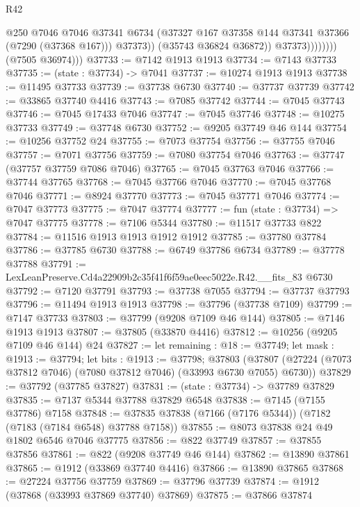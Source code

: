 \begin{lexlean}{R42}
\begin{coremodule}
{                              @250
                              @7046
                              @7046
                              @37341
                              @6734
                              (@37327 @167 @37358 @144 @37341 @37366 (@7290 (@37368 @167)))
                              @37373))
                          (@35743 @36824 @36872))
                        @37373))))))))
        (@7505 @36974)))
@37733 := @7142 @1913 @1913
@37734 := @7143 @37733
@37735 := (state : @37734) -> @7041
@37737 := @10274 @1913 @1913
@37738 := @11495 @37733
@37739 := @37738 @6730
@37740 := @37737 @37739
@37742 := @33865 @37740 @4416
@37743 := @7085 @37742
@37744 := @7045 @37743
@37746 := @7045 @17433 @7046
@37747 := @7045 @37746
@37748 := @10275 @37733
@37749 := @37748 @6730
@37752 := @9205 @37749 @46 @144
@37754 := @10256 @37752 @24
@37755 := @7073 @37754
@37756 := @37755 @7046
@37757 := @7071 @37756
@37759 := @7080 @37754 @7046
@37763 := @37747 (@37757 @37759 @7086 @7046)
@37765 := @7045 @37763 @7046
@37766 := @37744 @37765
@37768 := @7045 @37766 @7046
@37770 := @7045 @37768 @7046
@37771 := @8924 @37770
@37773 := @7045 @37771 @7046
@37774 := @7047 @37773
@37775 := @7047 @37774
@37777 := fun (state : @37734) => @7047 @37775
@37778 := @7106 @5344
@37780 := @11517 @37733 @822
@37784 := @11516 @1913 @1913 @1912 @1912
@37785 := @37780 @37784
@37786 := @37785 @6730
@37788 := @6749 @37786 @6734
@37789 := @37778 @37788
@37791 := LexLeanPreserve.Cd4a22909b2c35f41f6f59ae0eec5022e.R42.__fits_83 @6730
@37792 := @7120 @37791
@37793 := @37738 @7055
@37794 := @37737 @37793
@37796 := @11494 @1913 @1913
@37798 := @37796 (@37738 @7109)
@37799 := @7147 @37733
@37803 := @37799 (@9208 @7109 @46 @144)
@37805 := @7146 @1913 @1913
@37807 := @37805 (@33870 @4416)
@37812 := @10256 (@9205 @7109 @46 @144) @24
@37827 := let remaining : @18 := @37749;
  let mask : @1913 := @37794;
  let bits : @1913 := @37798;
  @37803 (@37807 (@27224 (@7073 @37812 @7046) (@7080 @37812 @7046) (@33993 @6730 @7055) @6730))
@37829 := @37792 (@37785 @37827)
@37831 := (state : @37734) -> @37789 @37829
@37835 := @7137 @5344 @37788 @37829 @6548
@37838 := @7145 (@7155 @37786) @7158
@37848 := @37835 @37838 (@7166 (@7176 @5344)) (@7182 (@7183 (@7184 @6548) @37788 @7158))
@37855 := @8073 @37838 @24 @49 @1802 @6546 @7046 @37775
@37856 := @822 @37749
@37857 := @37855 @37856
@37861 := @822 (@9208 @37749 @46 @144)
@37862 := @13890 @37861
@37865 := @1912 (@33869 @37740 @4416)
@37866 := @13890 @37865
@37868 := @27224 @37756 @37759
@37869 := @37796 @37739
@37874 := @1912 (@37868 (@33993 @37869 @37740) @37869)
@37875 := @37866 @37874
}
\end{coremodule}
\end{lexlean}
